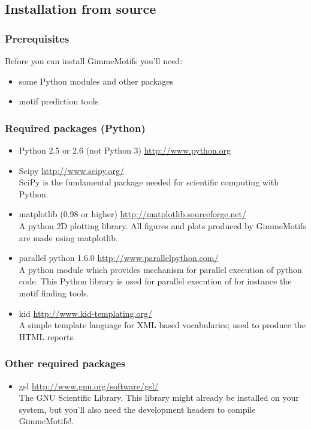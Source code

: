 \documentclass[11pt]{article}
\begin{document}
\subsection{Installation from source}

\subsubsection{Prerequisites}
Before you can install GimmeMotifs you'll need: 
\begin{itemize}
 \item some Python modules and other packages 
 \item motif prediction tools
\end{itemize}

\subsubsection{Required packages (Python)}
\begin{itemize}
\item Python 2.5 or 2.6 (not Python 3) \url{http://www.python.org}
\item Scipy \url{http://www.scipy.org/} \\
SciPy is the fundamental package needed for scientific computing with Python. 
\item matplotlib (0.98 or higher) \url{http://matplotlib.sourceforge.net/} \\
A python 2D plotting library. All figures and plots produced by GimmeMotifs are made using matplotlib.
\item parallel python 1.6.0 \url{http://www.parallelpython.com/} \\
A python module which provides mechanism for parallel execution of python code. This Python library is used for parallel execution of for instance the motif finding tools. 
\item kid \url{http://www.kid-templating.org/} \\
A simple template language for XML based vocabularies; used to produce the HTML reports.
\end{itemize}

\subsubsection{Other required packages}
\begin{itemize}
 \item gsl \url{http://www.gnu.org/software/gsl/} \\
The GNU Scientific Library. 
This library might already be installed on your system, but you'll also need the development headers to compile GimmeMotifs!. 
\end{itemize}
\end{document}
